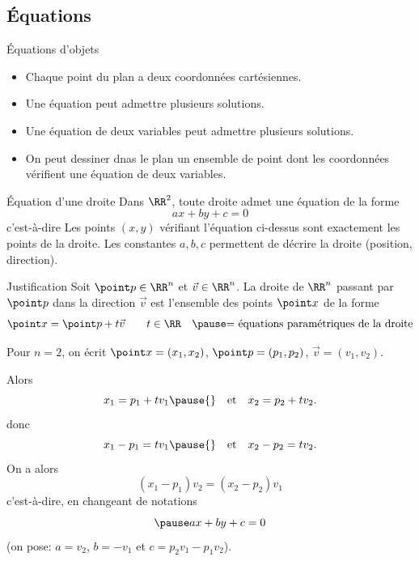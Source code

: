 \documentclass[french,xcolor=svgnames]{beamer}
\begin{document}
\subsection{Équations}
\begin{frame}{Équations d'objets}
  \begin{remark*}
    \begin{itemize}[<+->]
    \item Chaque point du plan a deux coordonnées cartésiennes.
    \item Une équation peut admettre plusieurs solutions.
    \item Une équation de deux variables peut admettre plusieurs solutions.
    \item On peut dessiner dnas le plan un ensemble de point dont les coordonnées vérifient une équation de deux variables.
    \end{itemize}
  \end{remark*}

  \begin{block}{Équation d'une droite}\pause{}
    Dans $\RR^{2}$, toute droite admet une équation de la forme\pause{}
    \begin{equation*}
      ax + by + c = 0
    \end{equation*}\pause{}
    c'est-à-dire \pause{} Les points $(x,y)$ vérifiant l'équation ci-dessus\pause{} sont exactement les points de la droite.\pause{} Les constantes $a,b,c$ permettent de décrire la droite\pause{} (position, direction).
  \end{block}
\end{frame}
\begin{frame}{Justification}\pause{}
  Soit $\point p \in\RR^{n}$\pause{} et $\vec{v} \in \RR^{n}$.\pause{}
  La droite de $\RR^{n}$ passant par $\point p$\pause{} dans la direction $\vec v$\pause{} est l'ensemble des points $\point x$ de la forme\pause{}
  \begin{equation*}
    \point x = \point p + t \vec v\qquad t \in \RR \quad\pause\text{= équations paramétriques de la droite}
  \end{equation*}\pause{}

  Pour $n = 2$,\pause{} on écrit $\point x = (x_1,x_2)$, $\point p = (p_1,p_2)$, $\vec v = (v_1,v_2)$\pause{}.
  
  Alors
  \begin{equation*}
    x_1 = p_1 + tv_1\pause{} \quad\text{et}\quad x_2 = p_2 + tv_2.
  \end{equation*}\pause
  donc
  \begin{equation*}
    x_1 - p_1 = tv_1\pause{} \quad\text{et}\quad x_2 - p_2 = tv_2.
  \end{equation*}\pause
  On a alors\pause{}
  \begin{equation*}
    (x_1 - p_1)v_2 = (x_2 - p_2) v_1
  \end{equation*}\pause
  c'est-à-dire, en changeant de notations
  \begin{equation*}\pause
    ax + by + c = 0
  \end{equation*}\pause{}
  (on pose:\pause{} $a = v_2$, $b = -v_1$ et $c = p_2v_1 - p_1v_2$).
\end{frame}
\end{document}
